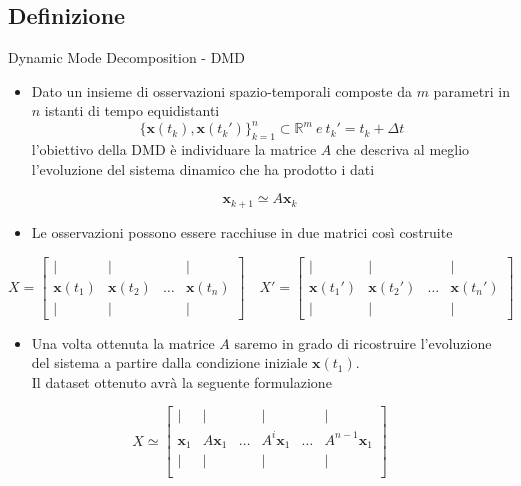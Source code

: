 \documentclass[serif]{beamer}
\newcommand{\R}{\mathbb{R}}
\begin{document}
\subsection{Definizione}
\begin{frame}{Dynamic Mode Decomposition - DMD}
\begin{itemize}
    \item Dato un insieme di osservazioni spazio-temporali composte da \(m\) parametri in \(n\) istanti di tempo equidistanti \[ \{\mathbf{x}(t_k),\mathbf{x}(t_k')\}_{k=1}^n \subset \R^m \ e \ t_k'=t_k + \Delta t \]  l'obiettivo della DMD è individuare la matrice \(A\) che descriva al meglio l'evoluzione del sistema dinamico che ha prodotto i dati
\end{itemize}

\[\mathbf{x}_{k+1} \simeq A\mathbf{x}_k\]

\end{frame}
\begin{frame}
\begin{itemize}
    \item Le osservazioni possono essere racchiuse in due matrici così costruite
\end{itemize}

\[ X= \begin{bmatrix}
| & | &  & | \\
\mathbf{x}(t_1) & \mathbf{x}(t_2) & \dots & \mathbf{x}(t_n)\\
| & | & & |
\end{bmatrix} \quad 
X'= \begin{bmatrix}
| & | &  & | \\
\mathbf{x}(t_1') & \mathbf{x}(t_2') & \dots & \mathbf{x}(t_n')\\
| & | & & |
\end{bmatrix}
\]
\begin{itemize}
    \item Una volta ottenuta la matrice \(A\) saremo in grado di ricostruire l'evoluzione del sistema a partire dalla condizione iniziale \(\mathbf{x}(t_1)\). \\
    Il dataset ottenuto avrà la seguente formulazione
\end{itemize}

\[
X \simeq
\begin{bmatrix}
| & | & & | & & | \\
\mathbf{x}_1 & A \mathbf{x}_1 & \dots & A^i \mathbf{x}_1 & \dots &  A^{n-1}\mathbf{x}_1 \\
| & | & & | & & | \\
\end{bmatrix}
\]
\end{frame}
\end{document}
